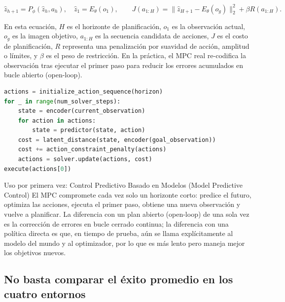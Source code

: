 \documentclass[a4paper]{article}
\begin{document}
\[
\hat z_{h+1}=P_\phi(\hat z_h,a_h),\quad \hat z_1=E_\theta(o_1),
\qquad
J(a_{1:H})=\|\hat z_{H+1}-E_\theta(o_g)\|_2^2+\beta R(a_{1:H}).
\]

En esta ecuación, $H$ es el horizonte de planificación, $o_1$ es la observación actual, $o_g$ es la imagen objetivo, $a_{1:H}$ es la secuencia candidata de acciones, $J$ es el costo de planificación, $R$ representa una penalización por suavidad de acción, amplitud o límites, y $\beta$ es el peso de restricción. En la práctica, el MPC real re-codifica la observación tras ejecutar el primer paso para reducir los errores acumulados en bucle abierto (open-loop).

\begin{lstlisting}[language=Python,caption={Ciclo mínimo de predicción-optimización del Latent MPC}]
actions = initialize_action_sequence(horizon)
for _ in range(num_solver_steps):
    state = encoder(current_observation)
    for action in actions:
        state = predictor(state, action)
    cost = latent_distance(state, encoder(goal_observation))
    cost += action_constraint_penalty(actions)
    actions = solver.update(actions, cost)
execute(actions[0])
\end{lstlisting}


\begin{knowledgebox}{Uso por primera vez: Control Predictivo Basado en Modelos (Model Predictive Control)}
El MPC compromete cada vez solo un horizonte corto: predice el futuro, optimiza las acciones, ejecuta el primer paso, obtiene una nueva observación y vuelve a planificar. La diferencia con un plan abierto (open-loop) de una sola vez es la corrección de errores en bucle cerrado continua; la diferencia con una política directa es que, en tiempo de prueba, aún se llama explícitamente al modelo del mundo y al optimizador, por lo que es más lento pero maneja mejor los objetivos nuevos.
\end{knowledgebox}

\subsection{No basta comparar el éxito promedio en los cuatro entornos}
\end{document}
